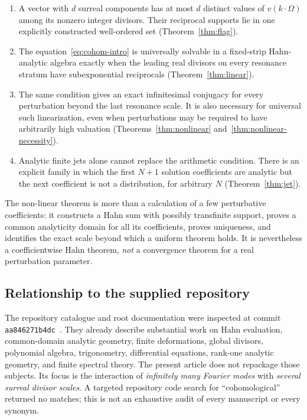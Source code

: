\documentclass[11pt,letterpaper]{article}
\theoremstyle{definition}
\theoremstyle{remark}
\numberwithin{equation}{section}
\begin{document}
\begin{enumerate}[label=\textbf{\arabic*.},leftmargin=*]
\item A vector with $d$ surreal components has at most $d$ distinct values of
$v(k\cdot\Omega)$ among its nonzero integer divisors.  Their reciprocal
supports lie in one explicitly constructed well-ordered set
(Theorem~\ref{thm:flag}).
\item The equation~\eqref{eq:cohom-intro} is universally solvable in a fixed-strip
Hahn-analytic algebra exactly when the leading real divisors on every
resonance stratum have subexponential reciprocals
(Theorem~\ref{thm:linear}).
\item The same condition gives an exact infinitesimal conjugacy for every
perturbation beyond the last resonance scale.  It is also necessary for
universal such linearization, even when perturbations may be required to have
arbitrarily high valuation (Theorems~\ref{thm:nonlinear}
and~\ref{thm:nonlinear-necessity}).
\item Analytic finite jets alone cannot replace the arithmetic condition.
There is an explicit family in which the first $N+1$ solution coefficients are
analytic but the next coefficient is not a distribution, for arbitrary $N$
(Theorem~\ref{thm:jet}).
\end{enumerate}

The non-linear theorem is more than a calculation of a few perturbative
coefficients: it constructs a Hahn sum with possibly transfinite support,
proves a common analyticity domain for all its coefficients, proves uniqueness,
and identifies the exact scale beyond which a uniform theorem holds.
It is nevertheless a coefficientwise Hahn theorem, \emph{not} a convergence
theorem for a real perturbation parameter.

\subsection{Relationship to the supplied repository}

The repository catalogue and root documentation were inspected at commit
\texttt{aa846271b4dc}~\cite{repo}.
They already describe substantial work on Hahn evaluation, common-domain
analytic geometry, finite deformations, global divisors, polynomial algebra,
trigonometry, differential equations, rank-one analytic geometry, and finite
spectral theory.  The present article does not repackage those subjects.
Its focus is the interaction of \emph{infinitely many Fourier modes} with
\emph{several surreal divisor scales}.  A targeted repository code search for
``cohomological'' returned no matches; this is not an exhaustive audit of every
manuscript or every synonym.
\end{document}
